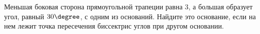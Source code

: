 \begin{ex}
	\begin{condition}
		Меньшая боковая сторона прямоугольной трапеции равна \( 3 \), а большая образует угол, равный \( 30\degree \), с одним из оснований. Найдите это основание, если на нем лежит точка пересечения биссектрис углов при другом основании.
	\end{condition}
\end{ex}